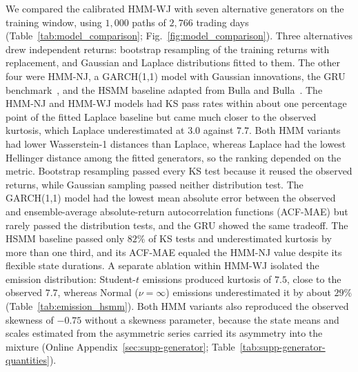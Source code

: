 We compared the calibrated HMM-WJ with seven alternative generators on
the training window, using $1{,}000$ paths of $2{,}766$ trading days
(Table~\ref{tab:model_comparison}; Fig.~\ref{fig:model_comparison}).
Three alternatives drew independent returns: bootstrap resampling of
the training returns with replacement, and Gaussian and Laplace
distributions fitted to them. The other four were HMM-NJ, a GARCH(1,1)
model with Gaussian innovations, the GRU benchmark~\cite{choEtAl2014gru}, and the HSMM
baseline adapted from Bulla and Bulla~\cite{bullaBulla2006}. The HMM-NJ and HMM-WJ models had KS pass rates within about one
percentage point of the fitted Laplace baseline but came much closer
to the observed kurtosis, which Laplace underestimated at $3.0$
against $7.7$. Both HMM variants had lower
Wasserstein-1 distances than Laplace, whereas Laplace had the lowest
Hellinger distance among the fitted generators, so the ranking
depended on the metric. Bootstrap resampling passed every KS test
because it reused the observed returns, while Gaussian sampling passed
neither distribution test. The GARCH(1,1) model had the lowest mean
absolute error between the observed and ensemble-average
absolute-return autocorrelation functions (ACF-MAE) but rarely passed
the distribution tests, and the GRU showed the same tradeoff. The HSMM
baseline passed only $82\%$ of KS tests and underestimated kurtosis by
more than one third, and its ACF-MAE equaled the HMM-NJ value despite
its flexible state durations. A separate ablation within HMM-WJ
isolated the emission distribution: Student-$t$ emissions produced
kurtosis of $7.5$, close to the observed $7.7$, whereas Normal
($\nu=\infty$) emissions underestimated it by about $29\%$
(Table~\ref{tab:emission_hsmm}). Both HMM variants also reproduced the
observed skewness of $-0.75$ without a skewness parameter, because the
state means and scales estimated from the asymmetric series carried
its asymmetry into the mixture (Online
Appendix~\ref{sec:supp-generator};
Table~\ref{tab:supp-generator-quantities}).

